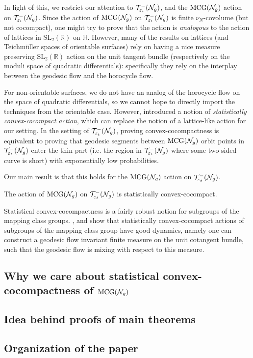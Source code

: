 In light of this, we restrict our attention to $\mathcal{T}_{\varepsilon_t}^{-}(\mathcal{N}_g)$, and the $\mathrm{MCG}(\mathcal{N}_g)$ action on $\mathcal{T}_{\varepsilon_t}^{-}(\mathcal{N}_g)$.
Since the action of $\mathrm{MCG}(\mathcal{N}_g)$ on $\mathcal{T}_{\varepsilon_t}^{-}(\mathcal{N}_g)$ is finite $\nu_N$-covolume (but not cocompact), one might try to prove that the action is \emph{analogous} to the action of lattices in $\mathrm{SL}_2(\mathbb{R})$ on $\mathbb{H}$.
However, many of the results on lattices (and Teichmüller spaces of orientable surfaces) rely on having a nice measure preserving $\mathrm{SL}_2(\mathbb{R})$ action on the unit tangent bundle (respectively on the moduli space of quadratic differentials): specifically they rely on the interplay between the geodesic flow and the horocycle flow.

For non-orientable surfaces, we do not have an analog of the horocycle flow on the space of quadratic differentials, so we cannot hope to directly import the techniques from the orientable case.
However, \textcite{10.1093/imrn/rny001} introduced a notion of \emph{statistically convex-cocompact action}, which can replace the notion of a lattice-like action for our setting.
In the setting of $\mathcal{T}_{\varepsilon_t}^{-}(\mathcal{N}_g)$, proving convex-cocompactness is equivalent to proving that geodesic segments between $\mathrm{MCG}(\mathcal{N}_g)$ orbit points in $\mathcal{T}_{\varepsilon_t}^{-}(\mathcal{N}_g)$ enter the thin part (i.e. the region in $\mathcal{T}_{\varepsilon_t}^{-}(\mathcal{N}_g)$ where some two-sided curve is short) with exponentially low probabilities.

Our main result is that this holds for the $\mathrm{MCG}(\mathcal{N}_g)$ action on $\mathcal{T}_{\varepsilon_t}^{-}(\mathcal{N}_g)$.
\begin{theorem}
  The action of $\mathrm{MCG}(\mathcal{N}_g)$ on $\mathcal{T}_{\varepsilon_t}^{-}(\mathcal{N}_g)$ is statistically convex-cocompact.
\end{theorem}

Statistical convex-cocompactness is a fairly robust notion for subgroups of the mapping class groups.
\textcite{gekhtman2023dynamics}, and \textcite{CGTY} show that statistically convex-cocompact actions of subgroups of the mapping class group have good dynamics, namely one can construct a geodesic flow invariant finite measure on the unit cotangent bundle, such that the geodesic flow is mixing with respect to this measure.

\subsection*{Why we care about statistical convex-cocompactness of $\mathrm{MCG}(\mathcal{N}_g)$}

\subsection*{Idea behind proofs of main theorems}

\subsection*{Organization of the paper}




